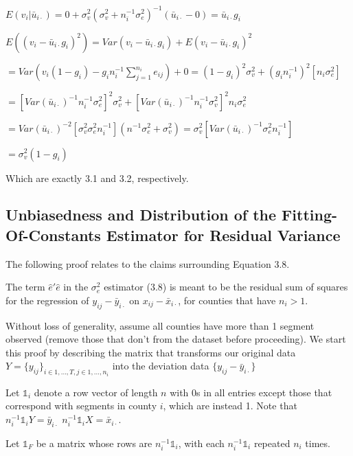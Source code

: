 \documentclass[11pt,letter]{article}
\begin{document}
\hspace{2cm}$E(v_i|\bar u_{i\cdot})=0+\sigma^2_v(\sigma^2_v+n_i^{-1}\sigma^2_e)^{-1}(\bar u_{i\cdot}-0)=\bar u_{i\cdot}g_i$

\hspace{2cm}$E((v_i-\bar u_{i\cdot}g_i)^2)=Var(v_i-\bar u_{i\cdot}g_i)+E(v_i-\bar u_{i\cdot}g_i)^2$

\hspace{3cm}$=Var(v_i(1-g_i)-g_in^{-1}_i\sum_{j=1}^{n_i}e_{ij})+0=(1-g_i)^2\sigma^2_v+(g_in_i^{-1})^2[n_i\sigma^2_e]$

\hspace{3cm}$=[Var(\bar u_{i\cdot})^{-1}n_i^{-1}\sigma^2_e]^2\sigma^2_v+[Var(\bar u_{i\cdot})^{-1}n_i^{-1}\sigma^2_v]^2n_i\sigma^2_e$

\hspace{3cm}$=Var(\bar u_{i\cdot})^{-2}[\sigma^2_v\sigma^2_en^{-1}_i](n^{-1}\sigma^2_e+\sigma^2_v)=\sigma^2_v[Var(\bar u_{i\cdot})^{-1}\sigma^2_en_i^{-1}]$

\hspace{3cm}$=\sigma^2_v(1-g_i)$

Which are exactly 3.1 and 3.2, respectively.

\subsection{Unbiasedness and Distribution of the Fitting-Of-Constants Estimator for Residual Variance}

The following proof relates to the claims surrounding Equation 3.8.

The term $\hat e'\hat e$ in the $\sigma^2_e$ estimator (3.8) is meant to be the residual sum of squares for the regression of $y_{ij}-\bar y_{i\cdot}$ on $x_{ij}-\bar x_{i\cdot}$, for counties that have $n_i>1$. 

Without loss of generality, assume all counties have more than 1 segment observed (remove those that don't from the dataset before proceeding). We start this proof by describing the matrix that transforms our original data $Y=\{y_{ij}\}_{i\in 1,...,T, j\in 1,...,n_i}$ into the deviation data $\{y_{ij}-\bar y_{i\cdot}\}$

Let $\mathds{1}_i$ denote a row vector of length $n$ with 0s in all entries except those that correspond with segments in county $i$, which are instead 1. Note that $n_i^{-1}\mathds{1}_iY=\bar y_{i\cdot}$ $n_i^{-1}\mathds{1}_iX=\bar x_{i\cdot}$.

Let $\mathds{1}_F$ be a matrix whose rows are $n_i^{-1}\mathds{1}_i$, with each $n_i^{-1}\mathds{1}_i$ repeated $n_i$ times.\\
\end{document}
